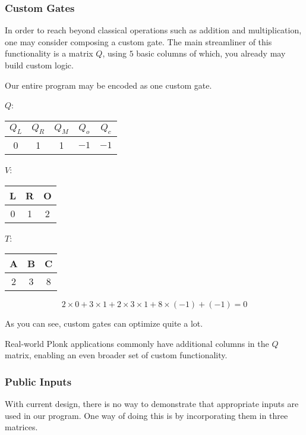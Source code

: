 \documentclass[../lecture-notes.tex]{subfiles}
\begin{document}
\subsubsection{Custom Gates}
In order to reach beyond classical operations such as addition and multiplication, one may consider composing a custom gate. The main streamliner of this functionality is a matrix $Q$, using $5$ basic columns of which, you already may build custom logic.

\begin{example}
Our entire program may be encoded as one custom gate.
\begin{center}
$Q$: 
\begin{tabular}{|c|c|c|c|c|}
\hline
$Q_L$ & $Q_R$ & $Q_M$ & $Q_o$ & $Q_c$ \\ 
\hline
0 & 1 & 1 & $-1$ & $-1$ \\ 
\hline
\end{tabular}
\quad $V$:
\begin{tabular}{|c|c|c|}
\hline
L & R & O \\
\hline
0 & 1 & 2 \\
\hline
\end{tabular}
\quad $T$:
\begin{tabular}{|c|c|c|}
\hline
A & B & C \\
\hline
2 & 3 & 8 \\
\hline
\end{tabular}

\[2 \times 0 + 3 \times 1 + 2 \times 3 \times 1 + 8 \times (-1) + (-1) = 0\]
\end{center}
As you can see, custom gates can optimize quite a lot.
\end{example}

\begin{remark}
Real-world Plonk applications commonly have additional columns in the $Q$ matrix, enabling an even broader set of custom functionality.
\end{remark}

\subsubsection{Public Inputs}
With current design, there is no way to demonstrate that appropriate inputs are used in our program. One way of doing this is by incorporating them in three matrices.
\end{document}
